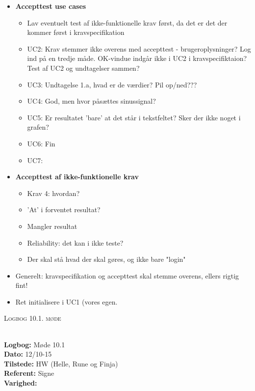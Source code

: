 \documentclass[a4paper,11pt,oneside]{memoir}
\begin{document}
\begin{itemize}
\begin{itemize}
\end{itemize}
\item \textbf{Accepttest use cases}
\begin{itemize}
\item Lav eventuelt test af ikke-funktionelle krav først, da det er det der kommer først i kravspecifikation
\item UC2: Krav stemmer ikke overens med accepttest - brugeroplysninger? Log ind på en tredje måde. OK-vindue indgår ikke i UC2 i kravspecifiktaion? Test af UC2 og undtagelser sammen? 
\item UC3: Undtagelse 1.a, hvad er de værdier? Pil op/ned???
\item UC4: God, men hvor påsættes sinussignal?
\item UC5: Er resultatet 'bare' at det står i tekstfeltet? Sker der ikke noget i grafen?
\item UC6: Fin
\item UC7:  
\end{itemize}
\item \textbf{Accepttest af ikke-funktionelle krav}
\begin{itemize}
\item Krav 4: hvordan?
\item 'At' i forventet resultat?
\item Mangler resultat
\item Reliability: det kan i ikke teste?
\item Der skal stå hvad der skal gøres, og ikke bare "login"
\end{itemize}
\item Generelt: kravspecifikation og accepttest skal stemme overens, ellers rigtig fint!
\item Ret initialisere i UC1 (vores egen. 
\end{itemize}

\newpage


\begin{center} 
\huge{\textsc{Logbog 10.1. møde}}
\end{center}

\textbf{ }
\\
\textbf{Logbog:} Møde 10.1
\\
\textbf{Dato:} 12/10-15
\\
\textbf{Tilstede:} HW (Helle, Rune og Finja)
\\
\textbf{Referent:} Signe
\\
\textbf{Varighed:} 
\\
\end{document}
